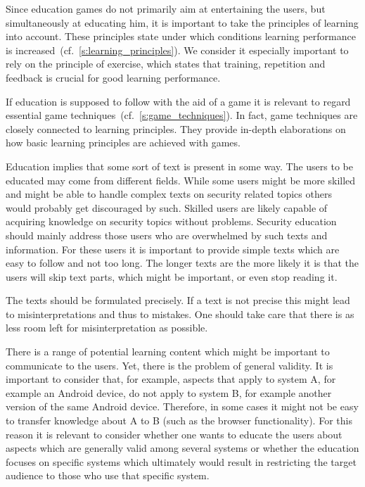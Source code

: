 \begin{description}[leftmargin=0cm]
	\item[Principles of Learning:] Since education games do not primarily aim at entertaining the users, but simultaneously at educating him, it is important to take the principles of learning into account.
These principles state under which conditions learning performance is increased~(cf.~\autoref{s:learning_principles}).
We consider it especially important to rely on the principle of exercise, which states that training, repetition and feedback is crucial for good learning performance.
	\item[Game Techniques:]  If education is supposed to follow with the aid of a game it is relevant to regard essential game techniques~(cf.~\autoref{s:game_techniques}).
In fact, game techniques are closely connected to learning principles.
They provide in-depth elaborations on how basic learning principles are achieved with games.
	\item[Simple and Short Text:] Education implies that some sort of text is present in some way.
The users to be educated may come from different fields.
While some users might be more skilled and might be able to handle complex texts on security related topics others would probably get discouraged by such.
Skilled users are likely capable of acquiring knowledge on security topics without problems.
Security education should mainly address those users who are overwhelmed by such texts and information.
For these users it is important to provide simple texts which are easy to follow and not too long.
The longer texts are the more likely it is that the users will skip text parts, which might be important, or even stop reading it.
\item[Precise Phrasing:] The texts should be formulated precisely. 
If a text is not precise this might lead to misinterpretations and thus to mistakes. 
One should take care that there is as less room left for misinterpretation as possible.
\item[General Validity:] There is a range of potential learning content which might be important to communicate to the users.
Yet, there is the problem of general validity.
It is important to consider that, for example, aspects that apply to system A, for example an Android device, do not apply to system B, for example another version of the same Android device.
Therefore, in some cases it might not be easy to transfer knowledge about A to B (such as the browser functionality).
For this reason it is relevant to consider whether one wants to educate the users about aspects which are generally valid among several systems or whether the education focuses on specific systems which ultimately would result in restricting the target audience to those who use that specific system.
\end{description}


